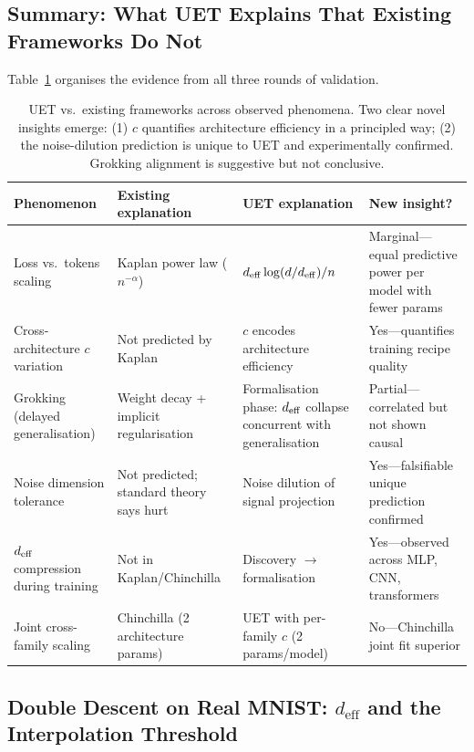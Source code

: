 \subsection{Summary: What UET Explains That Existing Frameworks Do Not}
\label{sec:summary-v3}

Table~\ref{tab:phenomena} organises the evidence from all three rounds of validation.

\begin{table}[H]
\centering\small
\begin{tabular}{p{3.2cm}p{3.5cm}p{3.5cm}p{2.0cm}}
\toprule
Phenomenon & Existing explanation & UET explanation & New insight? \\
\midrule
Loss vs.\ tokens scaling &
  Kaplan power law ($n^{-\alpha}$) &
  $d_{\mathrm{eff}}\log(d/d_{\mathrm{eff}})/n$ &
  Marginal---equal predictive power per model with fewer params \\
\addlinespace
Cross-architecture $c$ variation &
  Not predicted by Kaplan &
  $c$ encodes architecture efficiency &
  Yes---quantifies training recipe quality \\
\addlinespace
Grokking (delayed generalisation) &
  Weight decay + implicit regularisation \citep{grokking_lit} &
  Formalisation phase: $d_{\mathrm{eff}}$ collapse concurrent with generalisation &
  Partial---correlated but not shown causal \\
\addlinespace
Noise dimension tolerance &
  Not predicted; standard theory says hurt &
  Noise dilution of signal projection &
  Yes---falsifiable unique prediction confirmed \\
\addlinespace
$d_{\mathrm{eff}}$ compression during training &
  Not in Kaplan/Chinchilla &
  Discovery $\to$ formalisation &
  Yes---observed across MLP, CNN, transformers \\
\addlinespace
Joint cross-family scaling &
  Chinchilla (2 architecture params) &
  UET with per-family $c$ (2 params/model) &
  No---Chinchilla joint fit superior \\
\bottomrule
\end{tabular}
\caption{UET vs.\ existing frameworks across observed phenomena. Two clear
novel insights emerge: (1) $c$ quantifies architecture efficiency in a
principled way; (2) the noise-dilution prediction is unique to UET and
experimentally confirmed. Grokking alignment is suggestive but not conclusive.}
\label{tab:phenomena}
\end{table}

\subsection{Double Descent on Real MNIST: $d_\mathrm{eff}$ and the Interpolation Threshold}
\label{sec:dd-v2}

